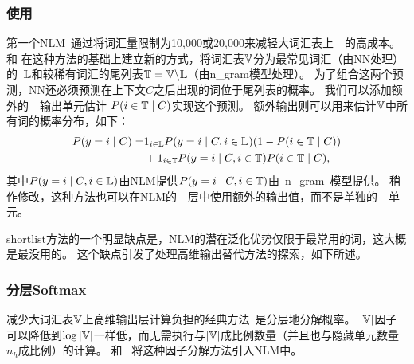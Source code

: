 \subsubsection{使用}
第一个\gls{NLM}~\citep{BenDucVin01-small,Bengio-nnlm2003-small}通过将词汇量限制为10,000或20,000来减轻大词汇表上~~的高成本。
\citet{Schwenk+Gauvain2002}和 \citet{Schwenk-2007}在这种方法的基础上建立新的方式，将词汇表$\mathbb{V}$分为最常见词汇（由\gls{NN}处理）的~$\mathbb{L}$和较稀有词汇的尾列表$\mathbb{T} = \mathbb{V} \backslash \mathbb{L}$（由\gls{n_gram}模型处理）。
为了组合这两个预测，\gls{NN}还必须预测在上下文$C$之后出现的词位于尾列表的概率。
我们可以添加额外的~~输出单元估计 $P(i \in \mathbb{T} \mid C)$实现这个预测。
额外输出则可以用来估计$\mathbb{V}$中所有词的概率分布，如下：
\begin{align}
 P(y=i\mid C)  =& 1_{i \in \mathbb{L}} P(y=i\mid C, i \in \mathbb{L}) (1 - P(i \in \mathbb{T}\mid C)) \nonumber \\
     & + 1_{i \in \mathbb{T}} P(y=i\mid C, i \in \mathbb{T}) P(i \in \mathbb{T}\mid C),
\end{align}
其中$P(y=i\mid C, i \in \mathbb{L})$由\gls{NLM}提供$P(y=i\mid C, i \in \mathbb{T})$由~\gls{n_gram}~模型提供。
稍作修改，这种方法也可以在\gls{NLM}的~~层中使用额外的输出值，而不是单独的~~单元。

\gls{shortlist}方法的一个明显缺点是，\gls{NLM}的潜在泛化优势仅限于最常用的词，这大概是最没用的。
这个缺点引发了处理高维输出替代方法的探索，如下所述。

\subsubsection{分层Softmax}
减少大词汇表$\mathbb{V}$上高维输出层计算负担的经典方法~\citep{Goodman2001}是分层地分解概率。
$|\mathbb{V}|$因子可以降低到$\log |\mathbb{V}|$一样低，而无需执行与$|\mathbb{V}|$成比例数量（并且也与隐藏单元数量$n_h$成比例）的计算。
\citet{BengioTR1215}和~\citet{Morin+Bengio-2005-small} 将这种因子分解方法引入\gls{NLM}中。


